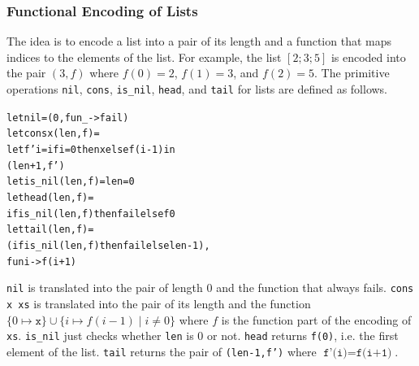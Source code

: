 \subsubsection{Functional Encoding of Lists}
\label{sec:list}

The idea is to encode a list into a pair of its length and a function that
maps indices to the elements of the list.  For example, the list
$[2;3;5]$ is encoded into the pair $(3,f)$ where $f(0) = 2$, $f(1) = 3$, and
$f(2) = 5$.  The primitive operations \texttt{nil}, \texttt{cons},
\texttt{is\_nil}, \texttt{head}, and \texttt{tail} for lists are defined
as follows.
\begin{alltt}
let nil = (0, fun _ -> fail)
let cons x (len,f) =
  let f' i = if i = 0 then x else f (i-1) in
    (len+1, f')
let is_nil (len,f) = len = 0
let head (len,f) =
  if is_nil (len,f) then fail else f 0
let tail (len,f) =
  (if is_nil (len,f) then fail else len-1),
   fun i -> f (i+1)
\end{alltt}
\texttt{nil} is translated into the pair of length $0$ and the
function that always fails.  \texttt{cons x xs} is translated into the
pair of its length and the function $\{0 \mapsto \mathtt{x}\} \cup \{i \mapsto
f (i-1) \mid i \neq 0\}$ where $f$ is the function part of the encoding of
\texttt{xs}.  \texttt{is\_nil} just checks whether \texttt{len} is 0 or not.
\texttt{head} returns \texttt{f(0)}, i.e. the first
element of the list.  \texttt{tail} returns the pair of
\texttt{(len-1,f')} where $\texttt{f'(i)} = \texttt{f(i+1)}$.



